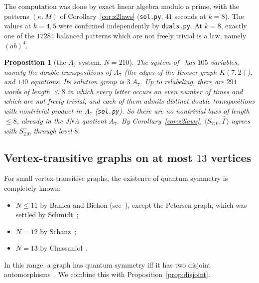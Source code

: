 \documentclass[11pt]{amsart}
\newtheorem{proposition}[theorem]{Proposition}
\theoremstyle{definition}
\theoremstyle{remark}
\theoremstyle{plain}
\numberwithin{equation}{section}
\numberwithin{table}{section}
\begin{document}
The computation was done by exact linear algebra modulo a prime, with the patterns $(\kappa,M)$ of Corollary~\ref{cor:z2laws} (\texttt{sol.py}, $41$ seconds at $k=8$). The values at $k=4,5$ were confirmed independently by \texttt{duals.py}. At $k=8$, exactly one of the $17284$ balanced patterns which are not freely trivial is a law, namely $(ab)^4$.

\begin{proposition}[the $A_7$ system, $N=210$]\label{prop:a7}
The system of~\cite{drs} has $105$ variables, namely the double transpositions of $A_7$ (the edges of the Kneser graph $K(7,2)$), and $140$ equations. Its solution group is $3.A_7$. Up to relabeling, there are $291$ words of length $\le8$ in which every letter occurs an even number of times and which are not freely trivial, and each of them admits distinct double transpositions with nontrivial product in $A_7$ (\texttt{sol.py}). So there are no nontrivial laws of length $\le8$, already in the JNA quotient $A_7$. By Corollary~\ref{cor:z2laws}, $\langle S_{210},\widehat\Gamma\rangle$ agrees with $S_{210}^+$ through level $8$.
\end{proposition}

\subsection{Vertex-transitive graphs on at most $13$ vertices}

For small vertex-transitive graphs, the existence of quantum symmetry is completely known:
\begin{itemize}
\item $N\le11$ by Banica and Bichon (see~\cite{sch2}), except the Petersen graph, which was settled by Schmidt~\cite{sch};
\item $N=12$ by Schanz~\cite{sz};
\item $N=13$ by Chassaniol~\cite{cha1,cha2}.
\end{itemize}
In this range, a graph has quantum symmetry iff it has two disjoint automorphisms~\cite[Observation~1]{sz}. We combine this with Proposition~\ref{prop:disjoint}.
\end{document}
